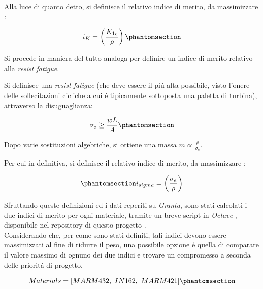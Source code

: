 \documentclass{article}
\begin{document}
        Alla luce di quanto detto, si definisce il relativo indice di merito, da massimizzare \autocite{SciencePubGroup}:

        \begin{equation}
            i_{K} = \left (\frac{K_{1c}}{\rho}\right)
            \phantomsection \label{equation:index_frac_tough}
        \end{equation}
        \clearpage 

        Si procede in maniera del tutto analoga per definire un indice di merito relativo alla 
        \textit{resist fatigue}.

        Si definisce una \textit{resist fatigue} (che deve essere il piú alta possibile,
        visto l'onere delle sollecitazioni cicliche a cui é tipicamente sottoposta una paletta di turbina), 
        attraverso la disuguaglianza:

        \begin{equation}
            \sigma_e \geq \frac{wL}{A}
            \phantomsection \label{equation:resist_fatigue}
        \end{equation}

        Dopo varie sostituzioni algebriche, si ottiene una massa $m \propto \frac{\rho}{\sigma_e}$.

        Per cui in definitiva, si definisce il relativo indice di merito, da massimizzare \autocite{SciencePubGroup}:

        \begin{equation}
            \phantomsection \label{equation:resist_fatigue_index}
            i_{sigma} = \left (\frac{\sigma_e}{\rho}\right)
        \end{equation}

        Sfruttando queste definizioni ed i dati reperiti su \textit{Granta}, 
        sono stati calcolati i due indici di merito per ogni materiale, tramite un breve script in 
        \textit{Octave} \autocite{Octave}, disponibile nel repository di questo progetto \autocite{Relazione_materiali}. \\ 

        Considerando che, per come sono stati definiti, tali indici devono essere massimizzati al fine di ridurre il peso, 
        una possibile opzione é quella di comparare il valore massimo di ognuno dei due indici e trovare un compromesso
        a seconda delle prioritá di progetto.

        \begin{equation}
            Materials = [MARM432, \ IN162, \ MARM421] 
            \phantomsection \label{vector:material_list}
        \end{equation}
\end{document}
